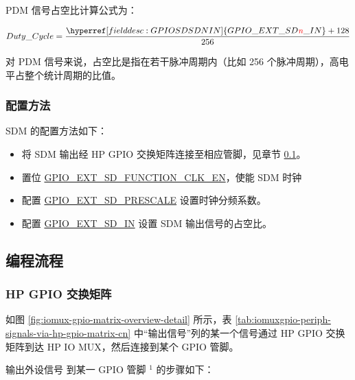 \documentclass[main\_\_CN.tex]{subfiles}
\begin{document}
PDM 信号占空比计算公式为：

    \[
    Duty\_Cycle=\frac{\hyperref[fielddesc:GPIOSDSDNIN]{GPIO\_EXT\_SD\regindex{n}\_IN} + 128} {256}
    \]

\begin{tiplisting}
对 PDM 信号来说，占空比是指在若干脉冲周期内（比如 256 个脉冲周期），高电平占整个统计周期的比值。
\end{tiplisting}

\subsubsection{配置方法}

SDM 的配置方法如下：

\begin{itemize}
    \item 将 SDM 输出经 HP GPIO 交换矩阵连接至相应管脚，见章节 \ref{IOMUXPeripheralOutput}。
    \item 置位 \hyperref[fielddesc:GPIOSDFUNCTIONCLKEN]{GPIO\_EXT\_SD\_FUNCTION\_CLK\_EN}，使能 SDM 时钟
    \item 配置 \hyperref[fielddesc:GPIOSDSDNPRESCALE]{GPIO\_EXT\_SD\_PRESCALE} 设置时钟分频系数。
    \item 配置 \hyperref[fielddesc:GPIOSDSDNIN]{GPIO\_EXT\_SD\_IN} 设置 SDM 输出信号的占空比。
\end{itemize}

\subsection{编程流程}\label{IOMUXPeripheralOutput}

\subsubsection{HP GPIO 交换矩阵}
\label{sec:prgramming-procedure-for-hp-output}
如图 \ref{fig:iomux-gpio-matrix-overview-detail} 所示，表 \ref{tab:iomuxgpio-periph-signals-via-hp-gpio-matrix-cn} 中“输出信号”列的某一个信号通过 HP GPIO 交换矩阵到达 HP IO MUX，然后连接到某个 GPIO 管脚。

输出外设信号  到某一 GPIO 管脚 \hyperref[output-note-1]{$^1$} 的步骤如下：
\end{document}
